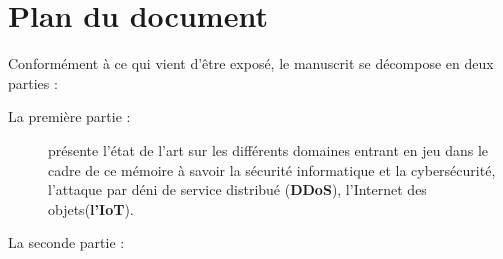 \section*{Plan du document}
Conformément à ce qui vient d’être exposé, le manuscrit se décompose en deux parties :
\begin{description}
\item[La première partie :] présente l'état de l'art sur les différents domaines entrant en jeu dans le cadre de ce mémoire à savoir la sécurité informatique et la cybersécurité, l'attaque par déni de service distribué (\textbf{DDoS}), l'Internet des objets(\textbf{l'IoT}).
\item[La seconde partie :] 
\end{description}
